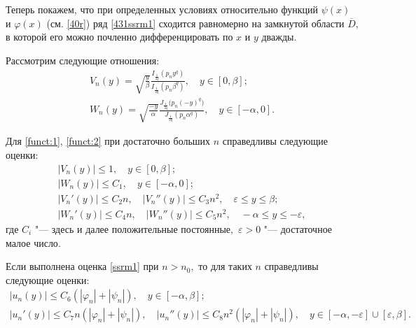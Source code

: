 Теперь покажем, что при определенных условиях относительно функций
$\psi(x)$ и $\varphi(x)$ (см. \eqref{40r}) ряд \eqref{431ssrm1} сходится равномерно на замкнутой области $\overline{D}$, в которой его можно почленно дифференцировать по $x$ и $y$ дважды.


Рассмотрим следующие отношения:
\begin{gather}
\label{funct:1}
V_{n}(y)=\sqrt{\frac{y}{\beta}}\frac{I_{\frac{1}{2q}}(p_{n}y^{q})}{I_{\frac{1}{2q}}(p_{n}\beta^{q})}, \quad 
y\in [0,\beta];
\\
\label{funct:2}
W_{n}(y)=\sqrt{\frac{-y}{\alpha}}\frac{J_{\frac{1}{2q}}\bigl(p_{n}(-y)^{q}\bigr)}{J_{\frac{1}{2q}}(p_{n}\alpha^q)}, \quad 
y\in [-\alpha,0].
\end{gather}

\smallskip

\hypertarget{saf:lemma:2}{}


\begin{lemma}[2]Для {\rm \eqref{funct:1}, \eqref{funct:2}} при   достаточно больших $n$ справедливы следующие
оценки{\rm\/:}
\begin{gather}
|V_{n}(y)|\leq 1,  \quad  y\in [0, \beta];
\\
|W_{n}(y)|\leq C_1,  \quad  y\in [-\alpha, 0];
\\
|V_{n}'(y)|\leq C_{2}n,  \quad  |V_{n}''(y)|\leq C_{3}n^{2}, \quad  \varepsilon\leq y\leq \beta;
\\
|W_{n}'(y)|\leq C_{4}n,  \quad  |W_{n}''(y)|\leq C_{5}n^{2},  \quad  -\alpha\leq y\leq -\varepsilon,
\end{gather}
где $C_{i}$ "--- здесь и далее положительные постоянные$,$ $\varepsilon>0$ "--- достаточное малое число$.$
\end{lemma}


\smallskip

\hypertarget{saf:lemma:3}{}

\begin{lemma}[3]Если выполнена оценка \eqref{ssrm1} при $n>n_{0},$ то для таких $n$
справедливы следующие оценки{\rm\/:}
\begin{gather}
|u_{n}(y)|\leq C_{6}( |\varphi_{n}|+|\psi_{n}|),  \quad  y\in
[-\alpha,\beta];
\\
|u_{n}'(y)|\leq C_{7}n(|\varphi_{n}|+|\psi_{n}|),  \quad 
|u_{n}''(y)|\leq C_{8}n^{2}(|\varphi_{n}|+|\psi_{n}|),  \quad 
y\in [-\alpha,-\varepsilon]\cup [\varepsilon,\beta].
\end{gather}
\end{lemma}

